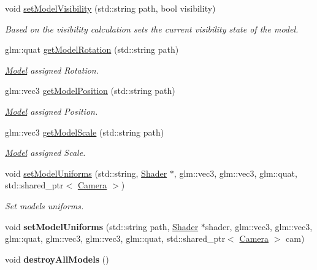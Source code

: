 \begin{DoxyCompactItemize}
void \hyperlink{class_resource_manager_a6e25cafdac62920c553b570604812650}{set\+Model\+Visibility} (std\+::string path, bool visibility)
\begin{DoxyCompactList}\small\item\em Based on the visibility calculation sets the current visibility state of the model. \end{DoxyCompactList}\item 
glm\+::quat \hyperlink{class_resource_manager_a45899dc887c74ecabcc3fce5e079b4e4}{get\+Model\+Rotation} (std\+::string path)
\begin{DoxyCompactList}\small\item\em \hyperlink{class_model}{Model} assigned Rotation. \end{DoxyCompactList}\item 
glm\+::vec3 \hyperlink{class_resource_manager_a61f0223aaee7a6b11e197a4b68c0d17d}{get\+Model\+Position} (std\+::string path)
\begin{DoxyCompactList}\small\item\em \hyperlink{class_model}{Model} assigned Position. \end{DoxyCompactList}\item 
glm\+::vec3 \hyperlink{class_resource_manager_a7f6456c08e57b52fa66ce2c293b6a947}{get\+Model\+Scale} (std\+::string path)
\begin{DoxyCompactList}\small\item\em \hyperlink{class_model}{Model} assigned Scale. \end{DoxyCompactList}\item 
void \hyperlink{class_resource_manager_a538b1d86fac74708cd854ca185e8a716}{set\+Model\+Uniforms} (std\+::string, \hyperlink{class_shader}{Shader} $\ast$, glm\+::vec3, glm\+::vec3, glm\+::quat, std\+::shared\+\_\+ptr$<$ \hyperlink{class_camera}{Camera} $>$)
\begin{DoxyCompactList}\small\item\em Set model\textquotesingle{}s uniforms. \end{DoxyCompactList}\item 
void {\bfseries set\+Model\+Uniforms} (std\+::string path, \hyperlink{class_shader}{Shader} $\ast$shader, glm\+::vec3, glm\+::vec3, glm\+::quat, glm\+::vec3, glm\+::vec3, glm\+::quat, std\+::shared\+\_\+ptr$<$ \hyperlink{class_camera}{Camera} $>$ cam)\hypertarget{class_resource_manager_a6da9fd1a7b8c939b850a5ed23158a781}{}\label{class_resource_manager_a6da9fd1a7b8c939b850a5ed23158a781}

\item 
void {\bfseries destroy\+All\+Models} ()\hypertarget{class_resource_manager_af05090de2a0ab1186c7b6f9669345b4b}{}\label{class_resource_manager_af05090de2a0ab1186c7b6f9669345b4b}


\end{DoxyCompactItemize}
